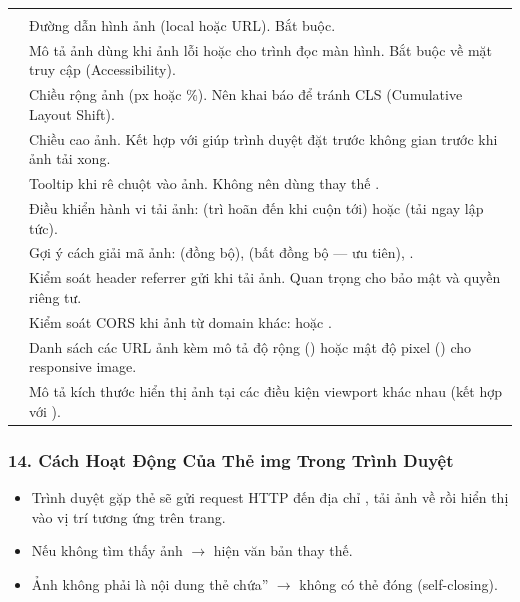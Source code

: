 \begin{prettyTableBox}
\begin{tabularx}{\linewidth}{C{2.8cm} Z}
 &  \\
 & Đường dẫn hình ảnh (local hoặc URL). Bắt buộc. \\
 & Mô tả ảnh dùng khi ảnh lỗi hoặc cho trình đọc màn hình. Bắt buộc về mặt truy cập (Accessibility). \\
 & Chiều rộng ảnh (px hoặc \%). Nên khai báo để tránh CLS (Cumulative Layout Shift). \\
 & Chiều cao ảnh. Kết hợp với  giúp trình duyệt đặt trước không gian trước khi ảnh tải xong. \\
 & Tooltip khi rê chuột vào ảnh. Không nên dùng thay thế . \\
 & Điều khiển hành vi tải ảnh:  (trì hoãn đến khi cuộn tới) hoặc  (tải ngay lập tức). \\
 & Gợi ý cách giải mã ảnh:  (đồng bộ),  (bất đồng bộ — ưu tiên), . \\
 & Kiểm soát header referrer gửi khi tải ảnh. Quan trọng cho bảo mật và quyền riêng tư. \\
 & Kiểm soát CORS khi ảnh từ domain khác:  hoặc . \\
 & Danh sách các URL ảnh kèm mô tả độ rộng () hoặc mật độ pixel () cho responsive image. \\
 & Mô tả kích thước hiển thị ảnh tại các điều kiện viewport khác nhau (kết hợp với ). \\
\end{tabularx}
\end{prettyTableBox}

\subsubsection{14. Cách Hoạt Động Của Thẻ img Trong Trình Duyệt}

\begin{conceptBox}
\begin{itemize}[leftmargin=1.5em, itemsep=3pt, parsep=0pt]
    \item Trình duyệt gặp thẻ  sẽ gửi request HTTP đến địa chỉ , tải ảnh về rồi hiển thị vào vị trí tương ứng trên trang.
    \item Nếu không tìm thấy ảnh $\rightarrow$ hiện văn bản  thay thế.
    \item Ảnh không phải là nội dung \codeinline{}thẻ chứa'' $\rightarrow$ không có thẻ đóng (self-closing).
\end{itemize}
\end{conceptBox}

